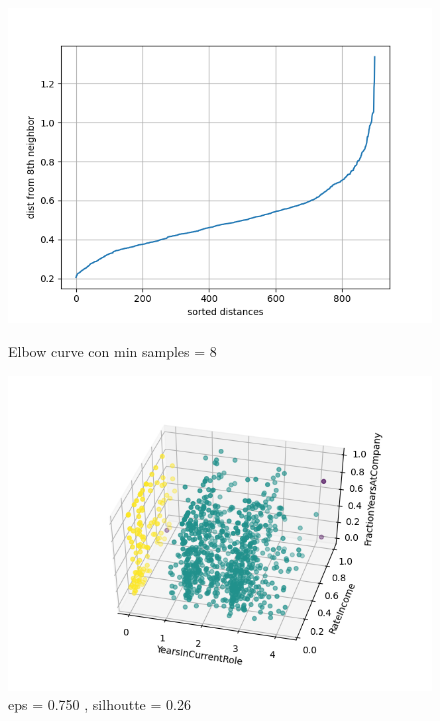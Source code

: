 \documentclass[a4paper,9pt]{article}
\begin{document}
\begin{figure}[H]
\begin{minipage}[b]{0.45\textwidth}
\centering
\includegraphics[width=\textwidth]{Figure_1.png}
\caption{Elbow curve con min samples =  8 }
\label{etichetta1}
\end{minipage}
\hfill
\begin{minipage}[b]{0.45\textwidth}
\centering
\includegraphics[width=\textwidth]{Figure_24.png}
\caption{eps = 0.750 , silhoutte = 0.26 }
\label{etichetta2}
\end{minipage}
\end{figure}
\end{document}
